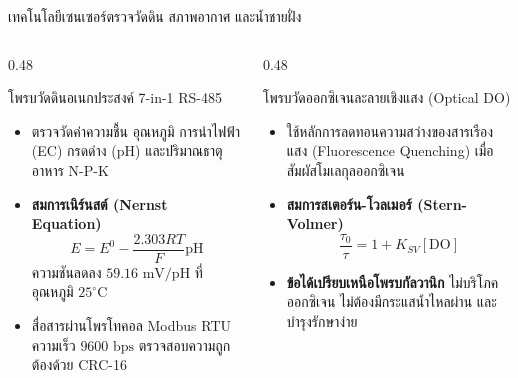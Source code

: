 \documentclass[aspectratio=169, 10pt]{beamer}
\begin{document}
\begin{frame}{เทคโนโลยีเซนเซอร์ตรวจวัดดิน สภาพอากาศ และน้ำชายฝั่ง}
\begin{columns}[T]
    \begin{column}{0.48\textwidth}
        \begin{mastercard}{โพรบวัดดินอเนกประสงค์ 7-in-1 RS-485}
            \begin{itemize}
                \item ตรวจวัดค่าความชื้น อุณหภูมิ การนำไฟฟ้า (EC) กรดด่าง (pH) และปริมาณธาตุอาหาร N-P-K
                \item \textbf{สมการเนิร์นสต์ (Nernst Equation)}
                \begin{equation*}
                    E = E^0 - \frac{2.303RT}{F}\text{pH}
                \end{equation*}
                ความชันลดลง $59.16\text{ mV/pH}$ ที่อุณหภูมิ $25^\circ\text{C}$
                \item สื่อสารผ่านโพรโทคอล Modbus RTU ความเร็ว $9600\text{ bps}$ ตรวจสอบความถูกต้องด้วย CRC-16
            \end{itemize}
        \end{mastercard}
    \end{column}
    \begin{column}{0.48\textwidth}
        \begin{aquacard}{โพรบวัดออกซิเจนละลายเชิงแสง (Optical DO)}
            \begin{itemize}
                \item ใช้หลักการลดทอนความสว่างของสารเรืองแสง (Fluorescence Quenching) เมื่อสัมผัสโมเลกุลออกซิเจน
                \item \textbf{สมการสเตอร์น-โวลเมอร์ (Stern-Volmer)}
                \begin{equation*}
                    \frac{\tau_0}{\tau} = 1 + K_{SV}[\text{DO}]
                \end{equation*}
                \item \textbf{ข้อได้เปรียบเหนือโพรบกัลวานิก} ไม่บริโภคออกซิเจน ไม่ต้องมีกระแสน้ำไหลผ่าน และบำรุงรักษาง่าย
            \end{itemize}
        \end{aquacard}
    \end{column}
\end{columns}
\end{frame}
\end{document}
